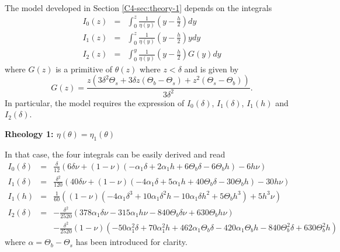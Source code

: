 The  model  developed in  Section  \ref{C4-sec:theory-1}  depends on  the
integrals
\begin{eqnarray}
  I_0(z)&=&\int_0^z\frac{1}{\eta(y)}\left(y-\frac{h}{2}\right)
            dy \\
  I_1(z) &=& \int_0^z\frac{1}{\eta(y)}\left(y-\frac{h}{2}\right)y dy\\
  I_2(z)&=&\int_0^y                         \frac{1}{\eta(y)}
            \left(y-\frac{h}{2}\right)G(y)dy
\end{eqnarray}
where $G(z)$  is a  primitive of $\theta(z)$  where $z<\delta$  and is
given by
\begin{equation}
  G(z) = \frac{z \left(3 \delta ^2 \Theta_s+3 \delta z (\Theta_b-\Theta_s)+z^2 (\Theta_s-\Theta_b)\right)}{3 \delta ^2}.
\end{equation}
In  particular, the  model requires  the expression  of $I_0(\delta)$,
$I_1(\delta)$, $I_1(h)$ and $I_2(\delta)$. 

\vspace{.5cm} \textbf{Rheology 1: $\eta(\theta)=\eta_1(\theta)$} \vspace{.5cm}

In that case, the four integrals can be easily derived and read
\begin{eqnarray}
I_0(\delta)&=&\frac{\delta}{12} \left(6 \delta \nu + (1-\nu) \left(- \alpha_1 \delta + 2 \alpha_1 h + 6 \Theta_{b} \delta - 6 \Theta_{b} h\right) - 6 h \nu\right)\nonumber\\
I_1(\delta)&=&\frac{\delta^{2}}{120} \left(40 \delta \nu + (1-\nu) \left(- 4 \alpha_1 \delta + 5 \alpha_1 h + 40 \Theta_{b} \delta - 30 \Theta_{b} h\right) - 30 h \nu\right)\nonumber\\
I_1(h)&=&\frac{1}{60} \left((1-\nu) \left(- 4 \alpha_1 \delta^{3} + 10 \alpha_1 \delta^{2} h - 10 \alpha_1 \delta h^{2} + 5 \Theta_{b} h^{3}\right) + 5 h^{3} \nu\right)\nonumber\\
I_2(\delta)&=&- \frac{\delta^{2}}{2520} \left(378  \alpha_1 \delta \nu -
               315  \alpha_1 h  \nu -  840 \Theta_{b}  \delta \nu  + 630
               \Theta_{b} h \nu \right)\nonumber\\
&&-\frac{\delta^{2}}{2520}(1-\nu)  \left(- 50  \alpha_1^{2} \delta  + 70
    \alpha_1^{2}  h  +  462  \alpha_1   \Theta_{b}  \delta  -  420  \alpha_1
    \Theta_{b}  h -  840  \Theta_{b}^{2} \delta  + 630  \Theta_{b}^{2}
    h\right)\nonumber
\end{eqnarray}
where $\alpha=\Theta_b-\Theta_s$ has been introduced for clarity.

